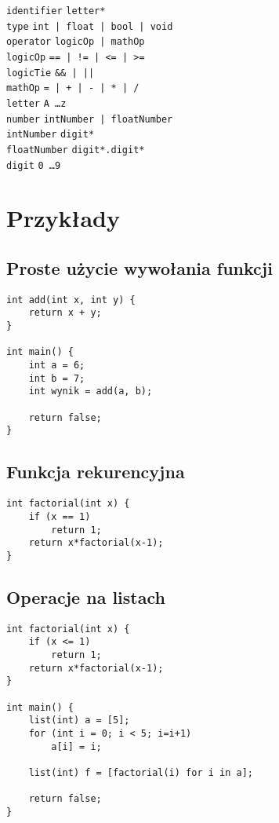 \documentclass{article}
\newcommand{\keyword}[1]{\colorbox{light-gray}{\texttt{#1}}}
\newcommand{\code}[1]{\texttt{#1}}
\begin{document}
\code{identifier} \textrightarrow \code{letter*} \\
\code{type} \textrightarrow \code{\keyword{int} | \keyword{float} | \keyword{bool} | \keyword{void}} \\
\code{operator} \textrightarrow \code{logicOp | mathOp} \\
\code{logicOp} \textrightarrow \code{\keyword{==} | \keyword{!=} | \keyword{<=} | \keyword{>=}} \\
\code{logicTie} \textrightarrow \code{\keyword{\&\&} | \keyword{||}} \\
\code{mathOp} \textrightarrow \code{\keyword{=} | \keyword{+} | \keyword{-} | \keyword{*} | \keyword{/}} \\
\code{letter} \textrightarrow \code{\keyword{A} \ldots \keyword{z}} \\
\code{number} \textrightarrow \code{intNumber | floatNumber} \\
\code{intNumber} \textrightarrow \code{digit*} \\
\code{floatNumber} \textrightarrow \code{digit*.digit*} \\
\code{digit} \textrightarrow \code{\keyword{0} \ldots \keyword{9}} \\

\newpage
\section{Przykłady}
\subsection{Proste użycie wywołania funkcji}
\begin{lstlisting}[tabsize=2]
int add(int x, int y) {
	return x + y;
}

int main() {
	int a = 6;
	int b = 7;
	int wynik = add(a, b);

	return false;
}
\end{lstlisting}

\subsection{Funkcja rekurencyjna}
\begin{lstlisting}[tabsize=2]
int factorial(int x) {
	if (x == 1)
		return 1;
	return x*factorial(x-1);
}
\end{lstlisting}

\subsection{Operacje na listach}
\begin{lstlisting}[tabsize=2]
int factorial(int x) {
	if (x <= 1)
		return 1;
	return x*factorial(x-1);
}

int main() {
	list(int) a = [5];
	for (int i = 0; i < 5; i=i+1)
		a[i] = i;

	list(int) f = [factorial(i) for i in a];

	return false;
}

\end{lstlisting}
\end{document}
